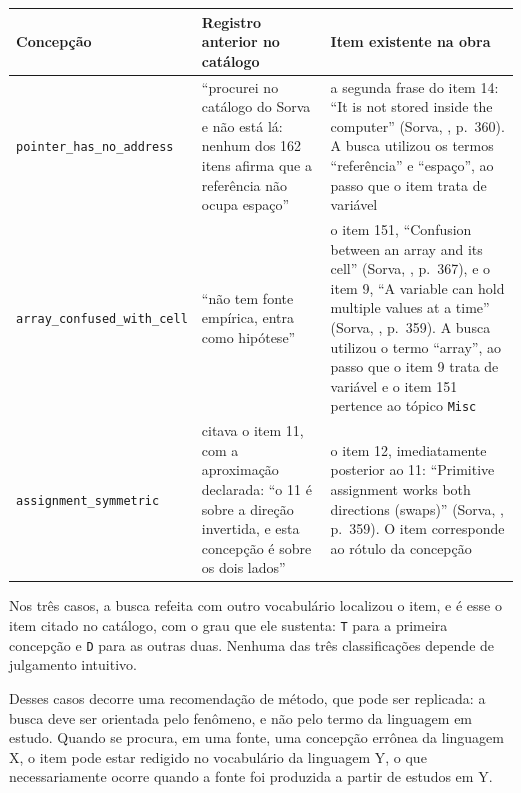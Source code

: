\begin{quadro}[htbp]
\caption{Buscas que não localizaram o item e o item existente na obra}\label{qua:4-6}
\footnotesize
\begin{tabularx}{\textwidth}{|X|X|X|}
\hline
\textbf{Concepção} & \textbf{Registro anterior no catálogo} & \textbf{Item existente na obra} \\ \hline
\texttt{pointer\_\allowbreak{}has\_\allowbreak{}no\_\allowbreak{}address} & ``procurei no catálogo do Sorva e não está lá: nenhum dos 162 itens afirma que a referência não ocupa espaço'' & a segunda frase do item 14: ``It is not stored inside the computer'' (Sorva, \citeyear{sorva2012}, p.~360). A busca utilizou os termos ``referência'' e ``espaço'', ao passo que o item trata de variável \\ \hline
\texttt{array\_\allowbreak{}confused\_\allowbreak{}with\_\allowbreak{}cell} & ``não tem fonte empírica, entra como hipótese'' & o item 151, ``Confusion between an array and its cell'' (Sorva, \citeyear{sorva2012}, p.~367), e o item 9, ``A variable can hold multiple values at a time'' (Sorva, \citeyear{sorva2012}, p.~359). A busca utilizou o termo ``array'', ao passo que o item 9 trata de variável e o item 151 pertence ao tópico \texttt{Misc} \\ \hline
\texttt{assignment\_\allowbreak{}symmetric} & citava o item 11, com a aproximação declarada: ``o 11 é sobre a direção invertida, e esta concepção é sobre os dois lados'' & o item 12, imediatamente posterior ao 11: ``Primitive assignment works both directions (swaps)'' (Sorva, \citeyear{sorva2012}, p.~359). O item corresponde ao rótulo da concepção \\ \hline
\end{tabularx}
\end{quadro}

Nos três casos, a busca refeita com outro vocabulário localizou o item, e é esse o item citado no catálogo, com o grau que ele sustenta: \texttt{T} para a primeira concepção e \texttt{D} para as outras duas. Nenhuma das três classificações depende de julgamento intuitivo.

Desses casos decorre uma recomendação de método, que pode ser replicada: a busca deve ser orientada pelo fenômeno, e não pelo termo da linguagem em estudo. Quando se procura, em uma fonte, uma concepção errônea da linguagem X, o item pode estar redigido no vocabulário da linguagem Y, o que necessariamente ocorre quando a fonte foi produzida a partir de estudos em Y.

